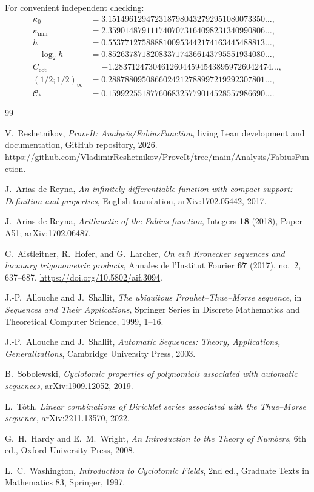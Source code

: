 \documentclass[11pt,oneside]{article}
\theoremstyle{definition}
\theoremstyle{remark}
\begin{document}
For convenient independent checking:
\begin{align*}
 \kappa_0&=3.1514961294723187980432792951080073350\ldots,\\
 \kappa_{\min}&=2.3590148791117407073164098231340990806\ldots,\\
 h&=0.5537712758888100953442174163445488813\ldots,\\
 -\log_2h&=0.8526378718208337174366143795551934080\ldots,\\
 C_{\cot}&=-1.2837124730461260445945438959726042474\ldots,\\
 (1/2;1/2)_\infty&=0.2887880950866024212788997219292307801\ldots,\\
 \mathcal C_*&=0.1599225518776068325779014528557986690\ldots.
\end{align*}

\begin{thebibliography}{99}

V.~Reshetnikov,
\emph{ProveIt: Analysis/FabiusFunction}, living Lean development and documentation,
GitHub repository, 2026.
\url{https://github.com/VladimirReshetnikov/ProveIt/tree/main/Analysis/FabiusFunction}.

J.~Arias de Reyna,
\emph{An infinitely differentiable function with compact support: Definition and
properties}, English translation, arXiv:1702.05442, 2017.

J.~Arias de Reyna,
\emph{Arithmetic of the Fabius function}, Integers \textbf{18} (2018), Paper A51;
arXiv:1702.06487.

C.~Aistleitner, R.~Hofer, and G.~Larcher,
\emph{On evil Kronecker sequences and lacunary trigonometric products},
Annales de l'Institut Fourier \textbf{67} (2017), no.~2, 637--687,
\url{https://doi.org/10.5802/aif.3094}.

J.-P.~Allouche and J.~Shallit,
\emph{The ubiquitous Prouhet--Thue--Morse sequence}, in
\emph{Sequences and Their Applications}, Springer Series in Discrete Mathematics
and Theoretical Computer Science, 1999, 1--16.

J.-P.~Allouche and J.~Shallit,
\emph{Automatic Sequences: Theory, Applications, Generalizations},
Cambridge University Press, 2003.

B.~Sobolewski,
\emph{Cyclotomic properties of polynomials associated with automatic sequences},
arXiv:1909.12052, 2019.

L.~T\'oth,
\emph{Linear combinations of Dirichlet series associated with the Thue--Morse
sequence}, arXiv:2211.13570, 2022.

G.~H.~Hardy and E.~M.~Wright,
\emph{An Introduction to the Theory of Numbers}, 6th ed., Oxford University Press,
2008.

L.~C.~Washington,
\emph{Introduction to Cyclotomic Fields}, 2nd ed., Graduate Texts in Mathematics
83, Springer, 1997.

\end{thebibliography}
\end{document}
